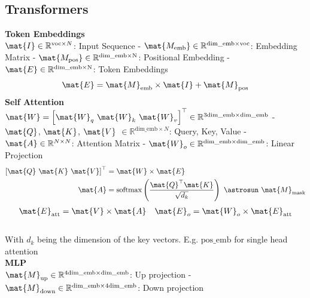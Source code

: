 \begin{multicols}{2}
    \section{Transformers}
    \begin{mdframed}[style=eqbox]
        \textbf{Token Embeddings}\\
        $\mat{I} \in \mathbb{R}^{\mathrm{voc}\times N}$: Input Sequence - $\mat{M_{\mathrm{emb}}} \in \mathbb{R}^{\mathrm{dim\_emb} \times \mathrm{voc}}$: Embedding Matrix - $\mat{M_{\mathrm{pos}}} \in \mathbb{R}^{\mathrm{dim\_emb} \times \mathrm{N}}$: Positional Embedding - $\mat{E} \in \mathbb{R}^{\mathrm{dim\_emb} \times \mathrm{N}}$: Token Embeddings
        \begin{align*}
            \mat{E} = \mat{M}_\mathrm{emb} \times \mat{I} + \mat{M}_\mathrm{pos}
        \end{align*}
        \textbf{Self Attention}\\
        $\mat{W} = \left[ \mat{W}_q ~ \mat{W}_k ~ \mat{W}_v \right]^\top \in \mathbb{R}^{3\mathrm{dim\_emb} \times \mathrm{dim\_emb}}$ - $\mat{Q}$, $\mat{K}$, $\mat{V}$ $\in \mathbb{R}^{\mathrm{dim\_emb} \times N}$: Query, Key, Value - $\mat{A} \in \mathbb{R}^{N \times N}$: Attention Matrix - $\mat{W}_o \in \mathbb{R}^{\mathrm{dim\_emb} \times \mathrm{dim\_emb}}$: Linear Projection
        \begin{align*}
            \left[ \mat{Q} ~ \mat{K} ~ \mat{V} \right]^\top &= \mat{W} \times \mat{E}\\
            \mat{A} &= \operatorname{softmax}\left( \frac{\mat{Q}^\top \mat{K}}{\sqrt{d_k}}\right)~\astrosun~ \mat{M}_\mathrm{mask}\\
        \end{align*}
        \vspace{-4em}
        \begin{align*}
            \mat{E}_\mathrm{att} = \mat{V} \times \mat{A} && \mat{E}_o = \mat{W}_o \times \mat{E}_\mathrm{att}
        \end{align*}\vspace{-18pt}\\
        {\tiny With $d_k$ being the dimension of the key vectors. E.g. $\mathrm{pos\_emb}$ for single head attention}\\[0.5em]
        \textbf{MLP}\\
        $\mat{M}_\mathrm{up} \in \mathbb{R}^{4\mathrm{dim\_emb} \times \mathrm{dim\_emb}}$: Up projection - $\mat{M}_\mathrm{down} \in \mathbb{R}^{\mathrm{dim\_emb} \times 4\mathrm{dim\_emb}}$: Down projection

\end{mdframed}
\end{multicols}
